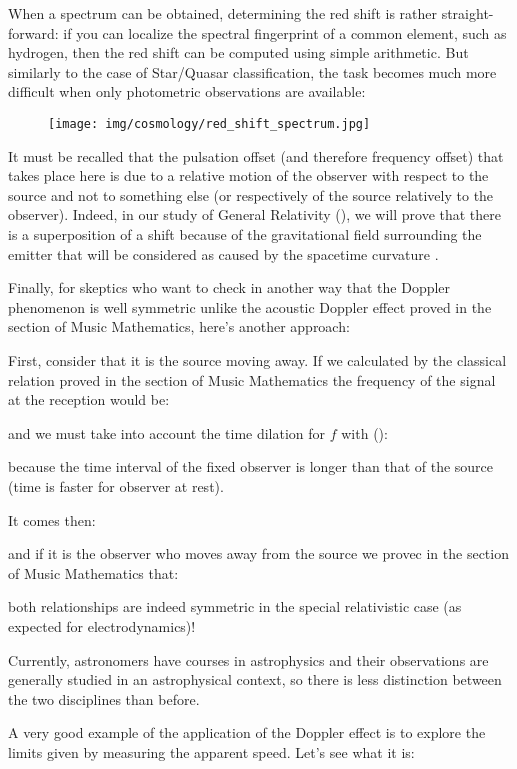 	When a spectrum can be obtained, determining the red shift is rather straight-forward: if you can localize the spectral fingerprint of a common element, such as hydrogen, then the red shift can be computed using simple arithmetic. But similarly to the case of Star/Quasar classification, the task becomes much more difficult when only photometric observations are available:
	\begin{figure}[H]
		\centering
		\texttt{[image: img/cosmology/red\_shift\_spectrum.jpg]}
	\end{figure}
	It must be recalled that the pulsation offset (and therefore frequency offset) that takes place here is due to a relative motion of the observer with respect to the source and not to something else (or respectively of the source relatively to the observer). Indeed, in our study of General Relativity (), we will prove that there is a superposition of a shift because of the gravitational field surrounding the emitter that will be considered as caused by the spacetime curvature .

	Finally, for skeptics who want to check in another way that the Doppler phenomenon is well symmetric unlike the acoustic Doppler effect proved in the section of Music Mathematics, here's another approach:

	First, consider that it is the source moving away. If we calculated by the classical relation proved in the section of Music Mathematics the frequency of the signal at the reception would be:
	
	and we must take into account the time dilation for $f$ with ():
	
	because the time interval of the fixed observer is longer than that of the source (time is faster for observer at rest).

	It comes then:
	
	and if it is the observer who moves away from the source we provec in the section of Music Mathematics that:
	
	both relationships are indeed symmetric in the special relativistic case (as expected for electrodynamics)!
	\begin{tcolorbox}[title=Remark,colframe=black,arc=10pt]
	Currently, astronomers have courses in astrophysics and their observations are generally studied in an astrophysical context, so there is less distinction between the two disciplines than before.
	\end{tcolorbox}
	A very good example of the application of the Doppler effect is to explore the limits given by measuring the apparent speed. Let's see what it is:
	

